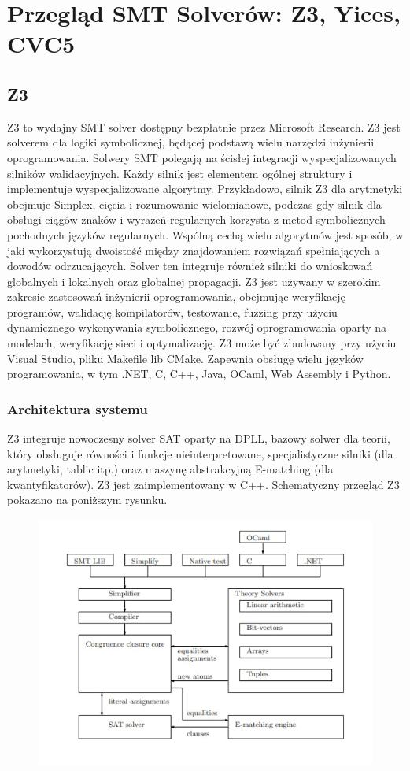  \chapter{Przegląd SMT Solverów: Z3, Yices, CVC5}

\section{Z3}
Z3 to wydajny SMT solver dostępny bezpłatnie przez Microsoft Research. Z3 jest solverem dla logiki symbolicznej, będącej podstawą wielu narzędzi inżynierii oprogramowania. Solwery SMT polegają na ścisłej integracji wyspecjalizowanych silników walidacyjnych. Każdy silnik jest elementem ogólnej struktury i implementuje wyspecjalizowane algorytmy. Przykładowo, silnik Z3 dla arytmetyki obejmuje Simplex, cięcia i rozumowanie wielomianowe, podczas gdy silnik dla obsługi ciągów znaków i wyrażeń regularnych korzysta z metod symbolicznych pochodnych języków regularnych. Wspólną cechą wielu algorytmów jest sposób, w jaki wykorzystują dwoistość między znajdowaniem rozwiązań spełniających a dowodów odrzucających. Solver ten integruje również silniki do wnioskowań globalnych i lokalnych oraz globalnej propagacji.
Z3 jest używany w szerokim zakresie zastosowań inżynierii oprogramowania, obejmując weryfikację programów, walidację kompilatorów, testowanie, fuzzing przy użyciu dynamicznego wykonywania symbolicznego, rozwój oprogramowania oparty na modelach, weryfikację sieci i optymalizację.
Z3 może być zbudowany przy użyciu Visual Studio, pliku Makefile lib CMake. Zapewnia obsługę wielu języków programowania, w tym .NET, C, C++, Java, OCaml, Web Assembly i Python.

\subsection{Architektura systemu}


	Z3 integruje nowoczesny solver SAT oparty na DPLL, bazowy solwer dla teorii, który obsługuje równości i funkcje nieinterpretowane, specjalistyczne silniki (dla arytmetyki, tablic itp.) oraz maszynę abstrakcyjną E-matching (dla kwantyfikatorów). Z3 jest zaimplementowany w C++. Schematyczny przegląd Z3 pokazano na poniższym rysunku.	
	

	\begin{figure}
		\centering
		\includegraphics[width=0.7\linewidth]{screenshot001}
		\caption{}
		\label{fig:screenshot001}
	\end{figure}

